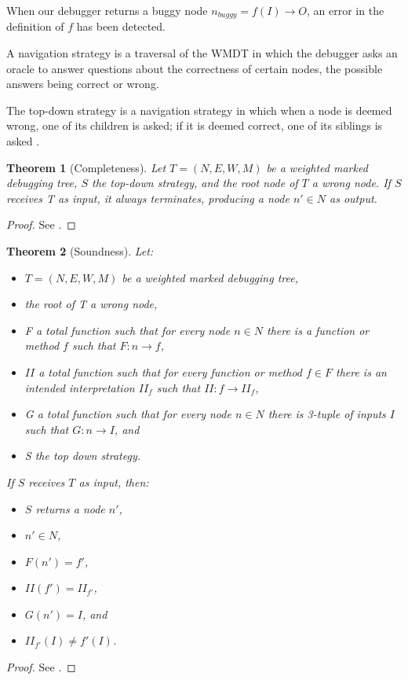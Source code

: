 \begin{definition}
When our debugger returns a buggy node \(n_{buggy} = f(I) \to O\), an error in the definition of \(f\) has been detected. 

\end{definition}
\begin{definition}
A navigation strategy is a traversal of the WMDT in which the debugger asks an oracle to answer questions about the correctness of certain nodes, the possible answers being correct or wrong.  
\end{definition}
\begin{definition}
The top-down strategy is a navigation strategy in which when a node is deemed wrong, one of its children is asked; if it is deemed
correct, one of its siblings is asked \cite{surveyStrategies}.
\end{definition}
\newtheorem{theorem}{Theorem}
\begin{theorem}[Completeness]
Let \(T = (N,E,W,M)\) be a weighted marked debugging tree, \(S\) the top-down strategy, and the root node of \(T\) a wrong node.
If \(S\) receives T as input, it always terminates, producing a node \(n'\in N\) as output.
\end{theorem}
\begin{proof}
See \cite{DeclarativeErrorDiagnosis}.
\end{proof}
\begin{theorem}[Soundness]
Let:
\begin{itemize}
    \item \(T = (N,E,W,M)\) be a weighted marked debugging tree,
    \item the root of T a wrong node,
    \item F a total function such that for every node \(n\in N\) there is a function or method \(f\) such that \(F:n\to f\),
    \item \(\mathit{II}\) a total function such that for every function or method \(f\in F\) there is an intended interpretation \(\mathit{II}_f\) such that \(\mathit{II}:f\to \mathit{II}_f\),
    \item G a total function such that for every node \(n\in N\) there is 3-tuple of inputs \(I\) such that \(G:n\to I\), and
    \item S the top down strategy.
\end{itemize}

If \(S\) receives \(T\) as input, then:
\begin{itemize}
    \item \(S\) returns a node \(n'\),
    \item \(n'\in N\),
    \item \(F(n') = f'\),
    \item \(\mathit{II}(f') = II_{f'}\),
    \item \(G(n') = I\), and
    \item \(\mathit{II}_{f'}(I)\neq f'(I)\).
\end{itemize}
\end{theorem}
\begin{proof}
See \cite{DeclarativeErrorDiagnosis}.
\end{proof}

